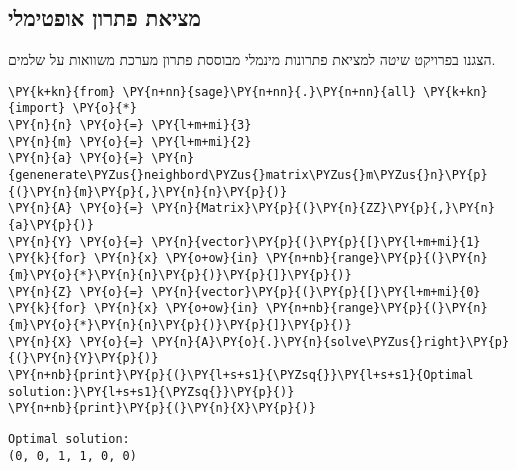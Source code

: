     \hypertarget{optimal-solution}{%
\subsection{מציאת פתרון אופטימלי}\label{optimal-solution}}
הצגנו בפרויקט שיטה למציאת פתרונות מינמלי מבוססת פתרון מערכת משוואות על שלמים.
\begin{english}
    \begin{tcolorbox}[breakable, size=fbox, boxrule=1pt, pad at break*=1mm,colback=cellbackground, colframe=cellborder]
\begin{Verbatim}[commandchars=\\\{\}]
\PY{k+kn}{from} \PY{n+nn}{sage}\PY{n+nn}{.}\PY{n+nn}{all} \PY{k+kn}{import} \PY{o}{*}
\PY{n}{n} \PY{o}{=} \PY{l+m+mi}{3}
\PY{n}{m} \PY{o}{=} \PY{l+m+mi}{2}
\PY{n}{a} \PY{o}{=} \PY{n}{genenerate\PYZus{}neighbord\PYZus{}matrix\PYZus{}m\PYZus{}n}\PY{p}{(}\PY{n}{m}\PY{p}{,}\PY{n}{n}\PY{p}{)}
\PY{n}{A} \PY{o}{=} \PY{n}{Matrix}\PY{p}{(}\PY{n}{ZZ}\PY{p}{,}\PY{n}{a}\PY{p}{)}
\PY{n}{Y} \PY{o}{=} \PY{n}{vector}\PY{p}{(}\PY{p}{[}\PY{l+m+mi}{1} \PY{k}{for} \PY{n}{x} \PY{o+ow}{in} \PY{n+nb}{range}\PY{p}{(}\PY{n}{m}\PY{o}{*}\PY{n}{n}\PY{p}{)}\PY{p}{]}\PY{p}{)}
\PY{n}{Z} \PY{o}{=} \PY{n}{vector}\PY{p}{(}\PY{p}{[}\PY{l+m+mi}{0} \PY{k}{for} \PY{n}{x} \PY{o+ow}{in} \PY{n+nb}{range}\PY{p}{(}\PY{n}{m}\PY{o}{*}\PY{n}{n}\PY{p}{)}\PY{p}{]}\PY{p}{)}
\PY{n}{X} \PY{o}{=} \PY{n}{A}\PY{o}{.}\PY{n}{solve\PYZus{}right}\PY{p}{(}\PY{n}{Y}\PY{p}{)}
\PY{n+nb}{print}\PY{p}{(}\PY{l+s+s1}{\PYZsq{}}\PY{l+s+s1}{Optimal solution:}\PY{l+s+s1}{\PYZsq{}}\PY{p}{)}
\PY{n+nb}{print}\PY{p}{(}\PY{n}{X}\PY{p}{)}
\end{Verbatim}
\end{tcolorbox}

    \begin{Verbatim}[commandchars=\\\{\}]
Optimal solution:
(0, 0, 1, 1, 0, 0)
    \end{Verbatim}
\end{english}

